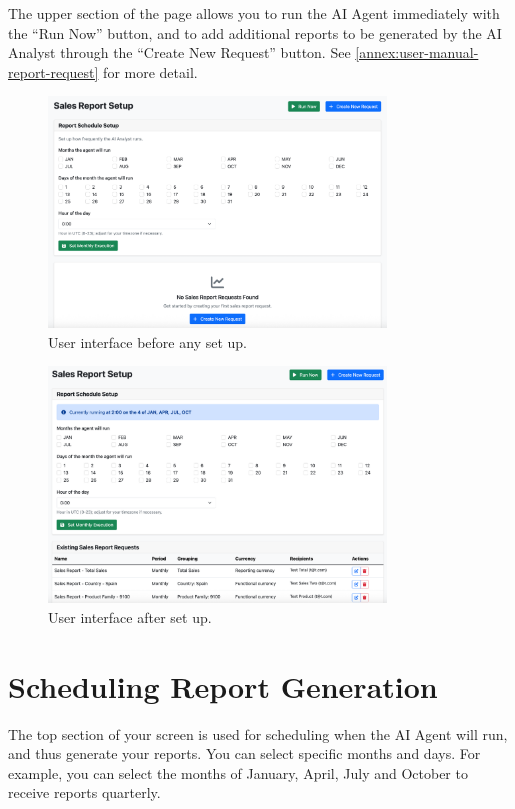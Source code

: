 \documentclass[a4paper]{report}
\begin{document}
The upper section of the page allows you to run the AI Agent immediately with the ``Run Now'' button, and to add additional reports to be generated by the AI Analyst through the ``Create New Request'' button. See \autoref{annex:user-manual-report-request} for more detail.

\begin{figure}[H]
\centering
\includegraphics[width=0.8\textwidth]{images/frontend-empty.png}
\caption{User interface before any set up.}
\label{fig:frontend-empty}
\end{figure}

\begin{figure}[h]
\centering
\includegraphics[width=0.8\textwidth]{images/frontend-filled.png}
\caption{User interface after set up.}
\label{fig:frontend-filled}
\end{figure}

\section{Scheduling Report Generation}

The top section of your screen is used for scheduling when the AI Agent will run, and thus generate your reports. You can select specific months and days. For example, you can select the months of January, April, July and October to receive reports quarterly.
\end{document}
